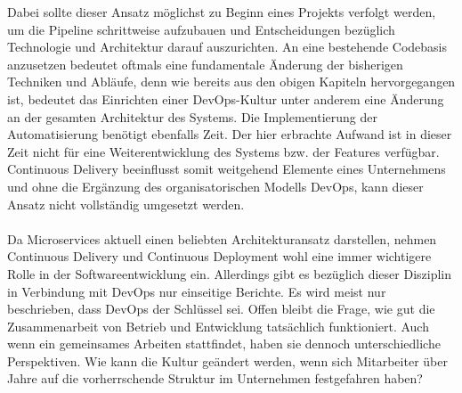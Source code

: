 Dabei sollte dieser Ansatz möglichst zu Beginn eines Projekts verfolgt werden, um die Pipeline schrittweise aufzubauen und Entscheidungen bezüglich Technologie und Architektur darauf auszurichten. An eine bestehende Codebasis anzusetzen bedeutet oftmals eine fundamentale Änderung der bisherigen Techniken und Abläufe, denn wie bereits aus den obigen Kapiteln hervorgegangen ist, bedeutet das Einrichten einer DevOps-Kultur unter anderem eine Änderung an der gesamten Architektur des Systems. Die Implementierung der Automatisierung benötigt ebenfalls Zeit. Der hier erbrachte Aufwand ist in dieser Zeit nicht für eine Weiterentwicklung des Systems bzw. der Features verfügbar. Continuous Delivery beeinflusst somit weitgehend Elemente eines Unternehmens und ohne die Ergänzung des organisatorischen Modells DevOps, kann dieser Ansatz nicht vollständig umgesetzt werden.\\ \\
Da Microservices aktuell einen beliebten Architekturansatz darstellen, nehmen Continuous Delivery und Continuous Deployment wohl eine immer wichtigere Rolle in der Softwareentwicklung ein. Allerdings gibt es bezüglich dieser Disziplin in Verbindung mit DevOps nur einseitige Berichte. Es wird meist nur beschrieben, dass DevOps der Schlüssel sei. Offen bleibt die Frage, wie gut die Zusammenarbeit von Betrieb und Entwicklung tatsächlich funktioniert. Auch wenn ein gemeinsames Arbeiten stattfindet, haben sie dennoch unterschiedliche Perspektiven. Wie kann die Kultur geändert werden, wenn sich Mitarbeiter über Jahre auf die vorherrschende Struktur im Unternehmen festgefahren haben? 


\ifCLASSOPTIONcaptionsoff
  \newpage
\fi